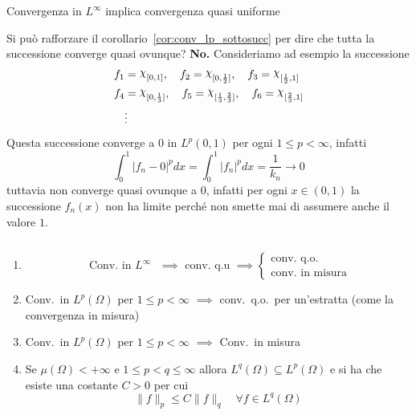 \begin{remark}
    Convergenza in \(L^{\infty}\) implica convergenza quasi uniforme
\end{remark}

Si può rafforzare il corollario~\ref{cor:conv_lp_sottosucc} per dire che tutta la successione converge quasi
ovunque? \textbf{No.} Consideriamo ad esempio la successione
\begin{align*}
    f_{1} &= \rchi_{[0, 1]}, \quad f_{2} = \rchi_{[0, \frac{1}{2}]}, \quad f_{3} =
    \rchi_{[\frac{1}{2}, 1]} \\
    f_{4} &= \rchi_{[0, \frac{1}{3}]}, \quad f_{5} = \rchi_{[\frac{1}{3},
    \frac{2}{3}]}, \quad f_{6} = \rchi_{[\frac{2}{3}, 1]} \\ 
          &\vdots
\end{align*}
Questa successione converge a \(0\) in \(L^{p}(0,1)\) per ogni \(1 \le p <
\infty\), infatti 
\[
    \int_{0}^{1} |f_{n} - 0|^{p} dx = \int_{0}^{1} |f_{n}|^{p} dx = \frac{1}{k_n}
    \to 0
\]
tuttavia non converge quasi ovunque a \(0\), infatti per ogni \(x \in (0, 1)\)
la successione \(f_{n}{(x)}\) non ha limite perché non smette mai di assumere
anche il valore \(1\).
\begin{proposition}[Convergenze]\label{prop:converenze_Lp} \( \) 
\begin{enumerate}[label = \arabic*.]
    \item \[
        \text{ Conv.~in \(L^{\infty}\)  } \implies \text{ conv.~q.u } \implies
        \begin{cases}
            \text{conv.~q.o.} \\
            \text{conv.~in misura}
        \end{cases}
    \]
    \item Conv.~in \(L^{p}{(\Omega)}\) per \(1 \le p< \infty\) \(\implies \)
        conv.~q.o.~per un'estratta (come la convergenza in misura)
    \item Conv.~in \(L^{p}{(\Omega)}\) per \(1 \le p < \infty\) \(\implies\)
        Conv.~in misura
    \item Se \(\mu{(\Omega)} < +\infty\) e \(1 \le p < q \le \infty\) allora
        \(L^{q}{(\Omega)} \subseteq L^{p}{(\Omega)}\) e si ha che esiste una
        costante \(C > 0\) per cui
        \[
            \|f\|_p \le C \|f\|_q \quad \forall f \in L^{q}{(\Omega)}
        \]
\end{enumerate}
\end{proposition}
